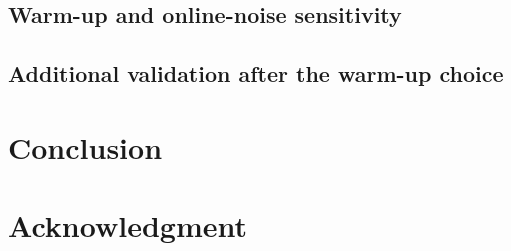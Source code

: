 \documentclass[letterpaper,10pt,conference]{ieeeconf}
\theoremstyle{remark}\newtheorem{remark}{Remark}
\begin{document}
\subsection{Warm-up and online-noise sensitivity}
\subsection{Additional validation after the warm-up choice}

\section{Conclusion}

\section*{Acknowledgment}
\end{document}

